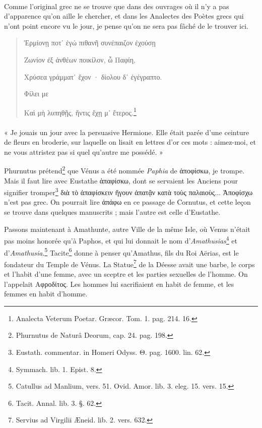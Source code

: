 \documentclass[a4paper, 18pt, oneside]{article}
\begin{document}
\paragraph{}
Comme l'original grec ne se trouve que dans des ouvrages où il n'y a pas d'apparence qu'on aille le chercher, et dans les Analectes des Poètes grecs qui n'ont point encore vu le jour, je pense qu'on ne sera pas fâché de le trouver ici.
\begin{quotation}
Ἑρμίονῃ ποτ᾿ ἐγώ πιθανῆ συνέπαιζον ἐχούσῃ

\hspace*{5mm}Ζωνίον ἐξ ἀνθέων ποικίλον, ὦ Παφίη,

Χρύσεα γράμματ᾽ ἔχον · δίολου δ᾽ ἐγέγραπτο.

\hspace*{5mm}Φίλει με

\hspace*{5mm}Καὶ μὴ λυπηθῇς, ἥντις ἔχῃ μ᾿ ἕτερος.\footnote{Analecta Veterum Poetar. Græcor. Tom. 1. pag. 214. 16.}
\end{quotation}
\paragraph{}

« Je jouais un jour avec la persuasive Hermione. Elle était parée d'une ceinture de fleurs en broderie, sur laquelle on lisait en lettres d'or ces mots : aimez-moi, et ne vous attristez pas si quel qu'autre me possédé. »

Phurnutus prétend\footnote{Phurnutus de Naturâ Deorum, cap. 24. pag. 198.} que Vénus a été nommée \emph{Paphia} de ἀποφίσκω, je trompe. Mais il faut lire avec Eustathe ἀπαφίσκω, dont se servaient les Anciens pour signifier tromper\footnote{Eustath. commentar. in Homeri Odyss. Θ. pag. 1600. lin. 62.} διὰ τὸ ἀπαφίσκειν ἤγουν ἀπατᾷν κατὰ τοὺς παλαιοὺς... Ἀποφίσχω n'est pas grec. On pourrait lire ἀπάφω en ce passage de Cornutus, et cette leçon se trouve dans quelques manuscrits ; mais l'autre est celle d'Eustathe.

Passons maintenant à Amathunte, autre Ville de la même Isle, où Venus n'était pas moins honorée qu'à Paphos, et qui lui donnait le nom d'\emph{Amathusias}\footnote{Symmach. lib. 1. Epist. 8.} et d'\emph{Amathusia}.\footnote{Catullus ad Manlium, vers. 51. Ovid. Amor. lib. 3. eleg. 15. vers. 15.} Tacite\footnote{Tacit. Annal. lib. 3. §. 62.} donne à penser qu'Amathus, fils du Roi Aërias, est le fondateur du Temple de Vénus. La Statue\footnote{Servius ad Virgilii Æneid. lib. 2. vers. 632.} de la Déesse avait une barbe, le corps et l'habit d'une femme, avec un sceptre et les parties sexuelles de l'homme. On l'appelait Αφροδίτος. Les hommes lui sacrifiaient en habit de femme, et les femmes en habit d'homme.
\end{document}
